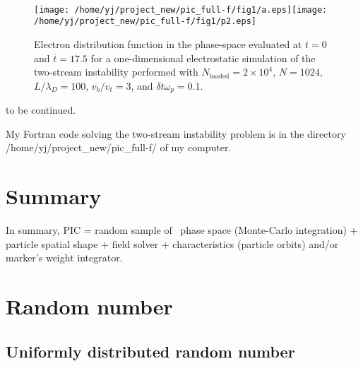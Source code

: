 \documentclass{article}
\newcommand{\tmop}[1]{\ensuremath{\operatorname{#1}}}
\begin{document}
\

\begin{figure}[h]
  \texttt{[image: /home/yj/project\_new/pic\_full-f/fig1/a.eps]}\texttt{[image: /home/yj/project\_new/pic\_full-f/fig1/p2.eps]}
  \caption{\label{12-20-e1}Electron distribution function in the phase-space
  evaluated at $t = 0$ and $\overline{t} = 17.5$ for a one-dimensional
  electrostatic simulation of the two-stream instability performed with
  $N_{\tmop{loaded}} = 2 \times 10^4$, $N = 1024$, $L / \lambda_D = 100$, $v_b
  / v_t = 3$, and $\delta t \omega_p = 0.1$.}
\end{figure}

to be continued.

My Fortran code solving the two-stream instability problem is in the directory
/home/yj/project\_new/pic\_full-f/ of my computer.

\section{Summary}

In summary, PIC = random sample of \ phase space (Monte-Carlo integration) +
particle spatial shape + field solver + characteristics (particle orbits)
and/or marker's weight integrator.

\section{\label{10-11-e1}Random number}

\subsection{Uniformly distributed random number}
\end{document}
